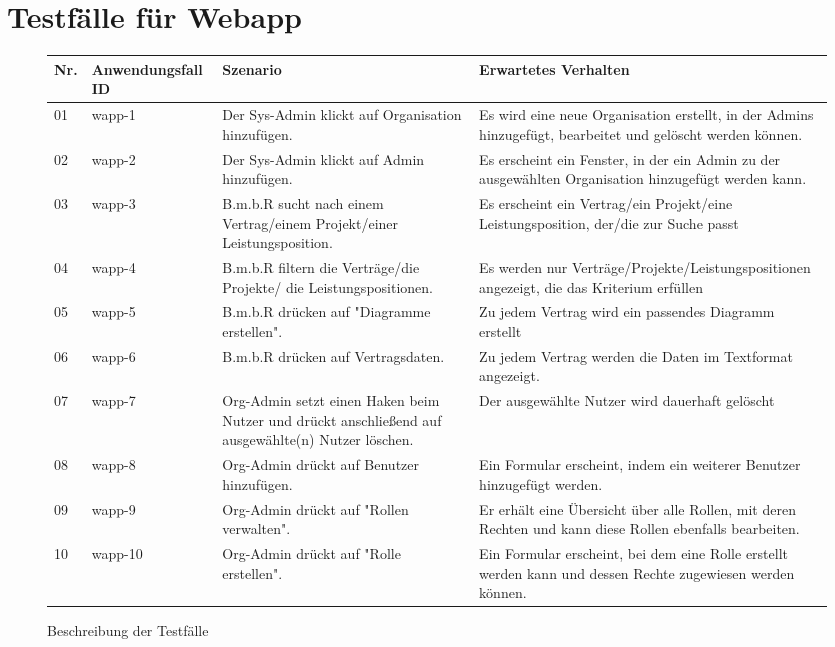 \section{Testfälle für Webapp}
\begin{figure}[!h]
	\begin{center}
		\begin{tabularx}{\textwidth}{ p{} | p{} | p{} | X }
			\textbf{Nr.} & \textbf{Anwendungsfall ID} & \textbf{Szenario} & \textbf{Erwartetes Verhalten} \\ \hline
			01 & wapp-1 & Der Sys-Admin klickt auf Organisation hinzufügen. & Es wird eine neue Organisation erstellt, in der Admins hinzugefügt, bearbeitet und gelöscht werden können. \\ \hline
			02 & wapp-2 & Der Sys-Admin klickt auf Admin hinzufügen. & Es erscheint ein Fenster, in der ein Admin zu der ausgewählten Organisation hinzugefügt werden kann. \\ \hline
			03 & wapp-3 & B.m.b.R sucht nach einem Vertrag/einem Projekt/einer Leistungsposition. & Es erscheint ein Vertrag/ein Projekt/eine Leistungsposition, der/die zur Suche passt \\ \hline
			04 & wapp-4 & B.m.b.R filtern die Verträge/die Projekte/ die Leistungspositionen. & Es werden nur Verträge/Projekte/Leistungspositionen angezeigt, die das Kriterium erfüllen \\ \hline
			05 & wapp-5 & B.m.b.R drücken auf "Diagramme erstellen". & Zu jedem Vertrag wird ein passendes Diagramm erstellt \\ \hline
			06 & wapp-6 & B.m.b.R drücken auf Vertragsdaten. & Zu jedem Vertrag werden die Daten im Textformat angezeigt. \\ \hline 
			07& wapp-7 & Org-Admin setzt einen Haken beim Nutzer und drückt anschließend auf ausgewählte(n) Nutzer löschen. & Der ausgewählte Nutzer wird dauerhaft gelöscht \\ \hline
			08 & wapp-8 & Org-Admin drückt auf Benutzer hinzufügen. & Ein Formular erscheint, indem ein weiterer Benutzer hinzugefügt werden. \\ \hline
			09 & wapp-9 & Org-Admin drückt auf "Rollen verwalten". & Er erhält eine Übersicht über alle Rollen, mit deren Rechten und kann diese Rollen ebenfalls bearbeiten. \\ \hline
			10 & wapp-10 & Org-Admin drückt auf "Rolle erstellen". & Ein Formular erscheint, bei dem eine Rolle erstellt werden kann und dessen Rechte zugewiesen werden können. \\ \hline
		\end{tabularx}	
	\end{center}
	\caption{Beschreibung der Testfälle}
	\label{fig:testfaelle-web-app-tabelle}
\end{figure}

